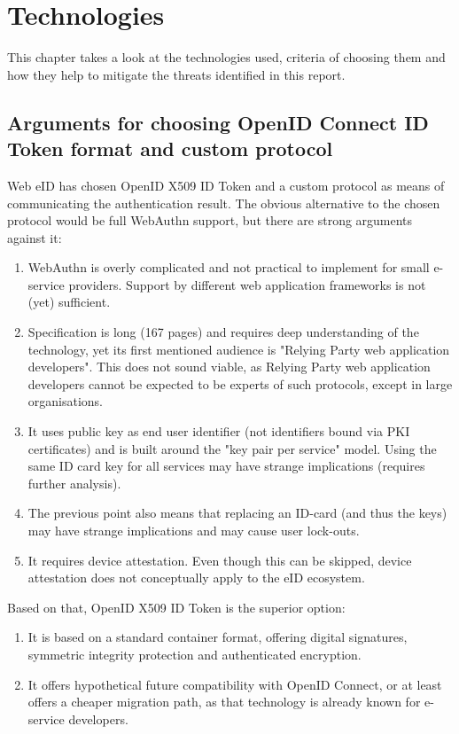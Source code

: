 \chapter{Technologies}

This chapter takes a look at the technologies used, criteria of choosing them and how they help to mitigate the threats identified in this report.

\section{Arguments for choosing OpenID Connect ID Token format and custom protocol}

Web eID has chosen OpenID X509 ID Token and a custom protocol as means of communicating the authentication result. The obvious alternative to the chosen protocol would be full WebAuthn support, but there are strong arguments against it:

\begin{enumerate}
    \item WebAuthn is overly complicated and not practical to implement for small e-service providers. Support by different web application frameworks is not (yet) sufficient.
    \item Specification is long (167 pages) and requires deep understanding of the technology, yet its first mentioned audience is "Relying Party web application developers". This does not sound viable, as Relying Party web application developers cannot be expected to be experts of such protocols, except in large organisations.
    \item It uses public key as end user identifier (not identifiers bound via PKI certificates) and is built around the "key pair per service" model. Using the same ID card key for all services may have strange implications (requires further analysis).
    \item The previous point also means that replacing an ID-card (and thus the keys) may have strange implications and may cause user lock-outs.
    \item It requires device attestation. Even though this can be skipped, device attestation does not conceptually apply to the eID ecosystem.
\end{enumerate}

Based on that, OpenID X509 ID Token is the superior option:

\begin{enumerate}
    \item It is based on a standard container format, offering digital signatures, symmetric integrity protection and authenticated encryption.
    \item It offers hypothetical future compatibility with OpenID Connect, or at least offers a cheaper migration path, as that technology is already known for e-service developers.
\end{enumerate}


